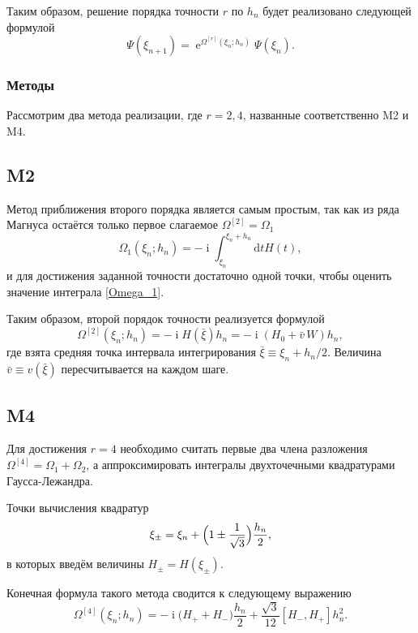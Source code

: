\documentclass[12pt]{article}
\DeclareMathOperator{\Exp}{e}
\DeclareMathOperator\Iunit{i}
\renewcommand\exp\Exp
\renewcommand\imath\Iunit
\begin{document}
Таким образом, решение порядка точности $r$ по $h_n$ будет реализовано следующей
формулой
\begin{equation}
  \Psi(\xi_{n+1})=\exp^{\Omega^{[r]}(\xi_n;h_n)}\Psi(\xi_n).
\end{equation}
 
\subsubsection{Методы}

Рассмотрим два метода реализации, где $r=2,4$, названные соответственно M2 и M4.

\subsection*{M2}

Метод приближения второго порядка является самым простым, так как из ряда
Магнуса остаётся только первое слагаемое $\Omega^{[2]}=\Omega_1$
\begin{equation}\label{Omega_1}
  \Omega_1(\xi_n;h_n)=-\imath\int_{\xi_n}^{\xi_n+h_n}\text{d}t H(t),
\end{equation} 
и для достижения заданной точности достаточно одной точки, чтобы оценить
значение интеграла \eqref{Omega_1}.

Таким образом, второй порядок точности реализуется формулой
\begin{equation}
  \Omega^{[2]}(\xi_n;h_n)=-\imath H(\bar\xi)h_n=-\imath (H_0+\bar{v}\,W)h_n,
\end{equation}
где взята средняя точка интервала интегрирования
$\bar\xi\equiv\xi_n+h_n/2$. Величина $\bar{v}\equiv v(\bar\xi)$ пересчитывается
на каждом шаге.

\subsection*{M4}

Для достижения $r=4$ необходимо считать первые два члена разложения
$\Omega^{[4]}=\Omega_1 + \Omega_2$, а аппроксимировать интегралы двухточечными
квадратурами Гаусса-Лежандра.

Точки вычисления квадратур
\begin{equation}
  \xi_{\pm}=\xi_n+\Bigl(1\pm\frac{1}{\sqrt{3}}\Bigr)\frac{h_n}{2},
\end{equation} 
в которых введём величины $H_{\pm}=H(\xi_{\pm})$.

Конечная формула такого метода сводится к следующему выражению 
\begin{equation}\label{Omega4}
  \Omega^{[4]}(\xi_n;h_n)=-\imath\big(H_++H_-\big)\frac{h_n}{2}+
  \frac{\sqrt{3}}{12}[H_-,H_+]h^2_n.
\end{equation}
\end{document}
